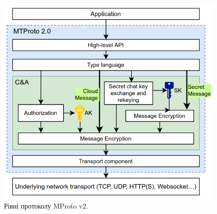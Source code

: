 \begin{figure}[ht]
        \centering
        \includegraphics[scale=0.37]{../IMAGES/mtproto2_protocol.png}
        \caption{Рівні протоколу MProto v2.}
        \label{mproto2}
\end{figure}

